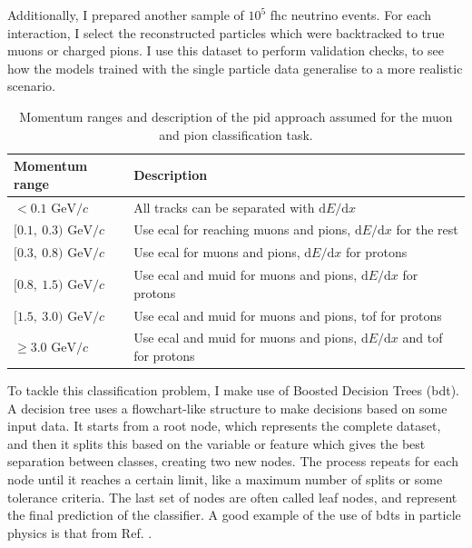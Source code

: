 Additionally, I prepared another sample of $10^{5}$ \gls{fhc} neutrino events. For each interaction, I select the reconstructed particles which were backtracked to true muons or charged pions. I use this dataset to perform validation checks, to see how the models trained with the single particle data generalise to a more realistic scenario.

\begin{table}[t]
	\caption{Momentum ranges and description of the \gls{pid} approach assumed for the muon and pion classification task.}
	\begin{center}
		\begin{small}
			\begin{tabular}{p{2.7cm}|l}
				Momentum range                                    & Description                                                                          \\[1mm] \hline \rule{0pt}{1.1\normalbaselineskip}
				$< 0.1$ \hfill $\mathrm{GeV}/c$      & All tracks can be separated with $\mathrm{d}E/\mathrm{d}x$                           \\[2mm]
				$[0.1,~0.3)$ \hfill $\mathrm{GeV}/c$ & Use \gls{ecal} for reaching muons and pions, $\mathrm{d}E/\mathrm{d}x$ for the rest        \\[2mm]
				$[0.3,~0.8)$ \hfill $\mathrm{GeV}/c$ & Use \gls{ecal} for muons and pions, $\mathrm{d}E/\mathrm{d}x$ for protons                  \\[2mm]
				$[0.8,~1.5)$ \hfill $\mathrm{GeV}/c$ & Use \gls{ecal} and \gls{muid} for muons and pions,  $\mathrm{d}E/\mathrm{d}x$ for protons        \\[2mm]
				$[1.5,~3.0)$ \hfill $\mathrm{GeV}/c$ & Use \gls{ecal} and \gls{muid} for muons and pions, \gls{tof} for protons                               \\[2mm]
				$\geq 3.0$ \hfill $\mathrm{GeV}/c$   & Use \gls{ecal} and \gls{muid} for muons and pions, $\mathrm{d}E/\mathrm{d}x$ and \gls{tof} for protons
			\end{tabular}
		\end{small}
	\end{center}
	\label{tab:bdt_regions}
\end{table}

To tackle this classification problem, I make use of Boosted Decision Trees (\gls{bdt}). A decision tree uses a flowchart-like structure to make decisions based on some input data. It starts from a root node, which represents the complete dataset, and then it splits this based on the variable or feature which gives the best separation between classes, creating two new nodes. The process repeats for each node until it reaches a certain limit, like a maximum number of splits or some tolerance criteria. The last set of nodes are often called leaf nodes, and represent the final prediction of the classifier. A good example of the use of \gls{bdt}s in particle physics is that from Ref. \cite{Cornell2021}.

